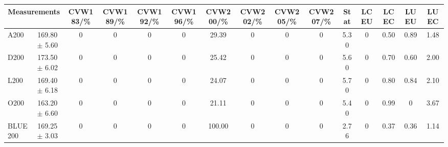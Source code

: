 \begin{table}[H]
\scriptsize
\begin{center}
\renewcommand{\arraystretch}{1.1}
\begin{tabular}{|lc|c|c|c|c|c|c|c|c|ccccc|}
\hline
\multicolumn{2}{|c|}{Measurements} & CVW{\tiny 183}/\%  & CVW{\tiny 189}/\%  & CVW{\tiny 192}/\%  & CVW{\tiny 196}/\%  & CVW{\tiny 200}/\%  & CVW{\tiny 202}/\%  & CVW{\tiny 205}/\%  & CVW{\tiny 207}/\%  & {\tiny Stat} & {\tiny LCEU} & {\tiny LCEC} & {\tiny LUEU} & {\tiny LUEC}\\
\hline
A200 &     169.80 $\pm$       5.60 &  0 &  0 &  0 &  0 &      29.39 &  0 &  0 &  0 &       5.30 &  0 &       0.50 &       0.89 &       1.48\\
D200 &     173.50 $\pm$       6.02 &  0 &  0 &  0 &  0 &      25.42 &  0 &  0 &  0 &       5.60 &  0 &       0.70 &       0.60 &       2.00\\
L200 &     169.40 $\pm$       6.18 &  0 &  0 &  0 &  0 &      24.07 &  0 &  0 &  0 &       5.70 &  0 &       0.80 &       0.84 &       2.10\\
O200 &     163.20 $\pm$       6.60 &  0 &  0 &  0 &  0 &      21.11 &  0 &  0 &  0 &       5.40 &  0 &       0.99 &  0 &       3.67\\
\hline
BLUE {\tiny 200} &     169.25 $\pm$       3.03 &  0 &  0 &  0 &  0 &     100.00 &  0 &  0 &  0 &       2.76 &  0 &       0.37 &       0.36 &       1.14\\
\hline
\end{tabular}
\renewcommand{\arraystretch}{1}
\end{center}
\end{table}
\vspace*{-0.5cm}
